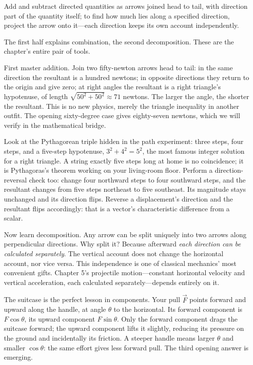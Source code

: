 
\begin{oneline}
Add and subtract directed quantities as arrows joined head to tail, with direction part of the quantity itself; to find how much lies along a specified direction, project the arrow onto it---each direction keeps its own account independently.
\end{oneline}

The first half explains combination, the second decomposition. These are the chapter's entire pair of tools.


\begin{mainline}
First master addition. Join two fifty-newton arrows head to tail: in the same direction the resultant is a hundred newtons; in opposite directions they return to the origin and give zero; at right angles the resultant is a right triangle's hypotenuse, of length \(\sqrt{50^{2}+50^{2}}\approx 71\) newtons. The larger the angle, the shorter the resultant. This is no new physics, merely the triangle inequality in another outfit. The opening sixty-degree case gives eighty-seven newtons, which we will verify in the mathematical bridge.

Look at the Pythagorean triple hidden in the path experiment: three steps, four steps, and a five-step hypotenuse, \(3^{2}+4^{2}=5^{2}\), the most famous integer solution for a right triangle. A string exactly five steps long at home is no coincidence; it is Pythagoras's theorem working on your living-room floor. Perform a direction-reversal check too: change four northward steps to four southward steps, and the resultant changes from five steps northeast to five southeast. Its magnitude stays unchanged and its direction flips. Reverse a displacement's direction and the resultant flips accordingly: that is a vector's characteristic difference from a scalar.

Now learn decomposition. Any arrow can be split uniquely into two arrows along perpendicular directions. Why split it? Because afterward \emph{each direction can be calculated separately}. The vertical account does not change the horizontal account, nor vice versa. This independence is one of classical mechanics' most convenient gifts. Chapter 5's projectile motion---constant horizontal velocity and vertical acceleration, each calculated separately---depends entirely on it.

The suitcase is the perfect lesson in components. Your pull \(\vec{F}\) points forward and upward along the handle, at angle \(\theta\) to the horizontal. Its forward component is \(F\cos\theta\), its upward component \(F\sin\theta\). Only the forward component drags the suitcase forward; the upward component lifts it slightly, reducing its pressure on the ground and incidentally its friction. A steeper handle means larger \(\theta\) and smaller \(\cos\theta\): the same effort gives less forward pull. The third opening answer is emerging.


\end{mainline}

